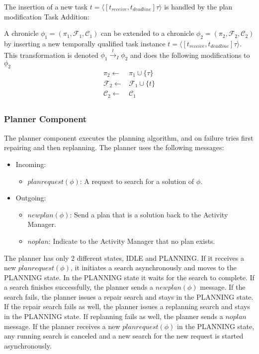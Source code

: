 The insertion of a new task $t = \langle[t_{receive},t_{deadline}] \tau\rangle$ is handled by the plan modification Task Addition:

\begin{definition}
    A chronicle $\phi_1 = (\pi_1,\mathcal{F}_1,\mathcal{C}_1)$ can be extended to a chronicle $\phi_2 = (\pi_2,\mathcal{F}_2,\mathcal{C}_2)$ by inserting a new temporally qualified task instance $t = \langle[t_{receive},t_{deadline}] \tau\rangle$. This transformation is denoted $\phi_1 \xrightarrow{t}_I \phi_2$ and does the following modifications to $\phi_2$
  \begin{align*}
    \pi_2 \leftarrow & \pi_1 \cup \{\tau\} \\
    \mathcal{F}_2 \leftarrow & \mathcal{F}_1 \cup \{t\} \\
    \mathcal{C}_2 \leftarrow & \mathcal{C}_1 \\
  \end{align*}
\end{definition}

\subsubsection{Planner Component}

The planner component executes the planning algorithm, and on failure tries first repairing and then replanning.
The planner uses the following messages:

\begin{itemize}
    \item Incoming:
    \begin{itemize}
        \item $planrequest(\phi)$: A request to search for a solution of $\phi$.
    \end{itemize}
    \item Outgoing:
    \begin{itemize}
        \item $newplan(\phi)$: Send a plan that is a solution back to the Activity Manager.
        \item $noplan$: Indicate to the Activity Manager that no plan exists.
    \end{itemize}
\end{itemize}

The planner has only 2 different states, IDLE and PLANNING.
If it receives a new $planrequest(\phi)$, it initiates a search asynchronously and moves to the PLANNING state.
In the PLANNING state it waits for the search to complete.
If a search finishes successfully, the planner sends a $newplan(\phi)$ message.
If the search fails, the planner issues a repair search and stays in the PLANNING state.
If the repair search fails as well, the planner issues a replanning search and stays in the PLANNING state.
If replanning fails as well, the planner sends a $noplan$ message.
If the planner receives a new $planrequest(\phi)$ in the PLANNING state, any running search is canceled and a new search for the new request is started asynchronously.

